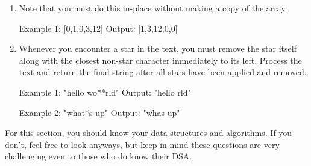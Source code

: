 \begin{enumerate}
\begin{console}
Example 1: 58 
Output:    "LVIII"
\end{console}\newpage

\item {}

Note that you must do this in-place without making a copy of the array.

\begin{console}
Example 1: [0,1,0,3,12]
Output:    [1,3,12,0,0]
\end{console}\newpage

\item {}
Whenever you encounter a star in the text, you must remove the star itself along with the closest non-star character immediately to its left. Process the text and return the final string after all stars have been applied and removed.

\begin{console}
Example 1: "hello wo**rld" 
Output:    "hello rld"

Example 2: "what*s up"
Output:    "whas up"
\end{console}\newpage 

\end{enumerate}

\newpage
For this section, you should know your data structures and algorithms. If you don't, feel free to look anyways, but keep in mind these questions are very challenging even to those who do know their DSA.\\\\


